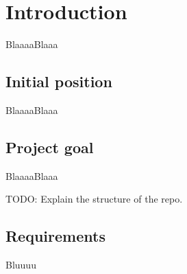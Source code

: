\chapter{Introduction}

BlaaaaBlaaa

\section{Initial position}

BlaaaaBlaaa


\section{Project goal}

BlaaaaBlaaa

TODO: Explain the structure of the repo.

\section{Requirements}

Bluuuu
